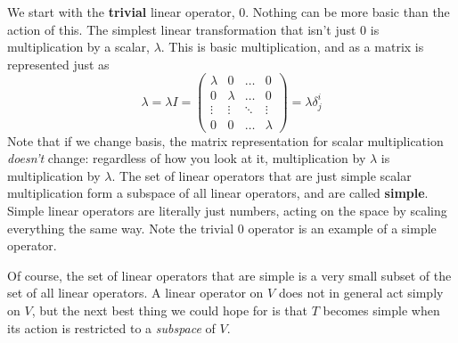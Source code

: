 	We start with the \textbf{trivial} linear operator, $0$. Nothing can be more basic than the action of this. The simplest linear transformation that isn't just $0$ is multiplication by a scalar, $\lambda$. This is basic multiplication, and as a matrix is represented just as
	\begin{equation*}
		\lambda = \lambda I=
		\begin{pmatrix}
			\lambda & 0 & \dots & 0 \\
			0 & \lambda & \dots & 0 \\
			\vdots & \vdots & \ddots & \vdots \\
			0 & 0 & \dots & \lambda
		\end{pmatrix}  = \lambda \delta^i_j
	\end{equation*}
	Note that if we change basis, the matrix representation for scalar multiplication \emph{doesn't} change: regardless of how you look at it, multiplication by $\lambda$ is multiplication by $\lambda$. The set of linear operators that are just simple scalar multiplication form a subspace of all linear operators, and are called \textbf{simple}. Simple linear operators are literally just numbers, acting on the space by scaling everything the same way. Note the trivial $0$ operator is an example of a simple operator.
	
	Of course, the set of linear operators that are simple is a very small subset of the set of all linear operators. A linear operator on $V$ does not in general act simply on $V$, but the next best thing we could hope for is that $T$ becomes simple when its action is restricted to a \emph{subspace} of $V$. 
	
	
%
	
